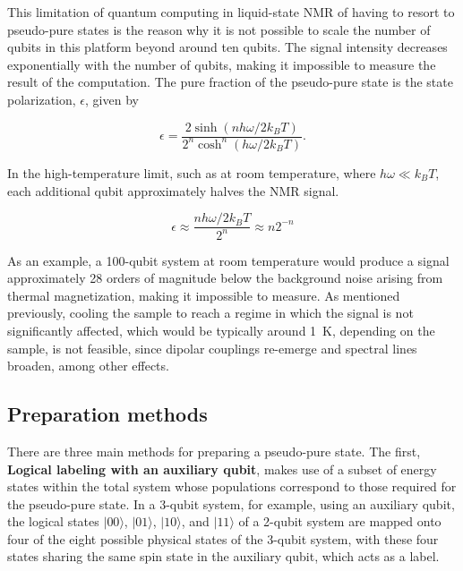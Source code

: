 This limitation of quantum computing in liquid-state NMR of having to resort to pseudo-pure states is the reason why it is not possible to scale the number of qubits in this platform beyond around ten qubits. The signal intensity decreases exponentially with the number of qubits, making it impossible to measure the result of the computation. The pure fraction of the pseudo-pure state is the state polarization, \(\epsilon\), given by

\begin{equation}
    \epsilon=\frac{2\sinh{(nh\omega/2k_B T)}}{2^n\cosh^n{(h\omega/2k_B T)}}.
    \label{eq:polarization}
\end{equation}

In the high-temperature limit, such as at room temperature, where \(h\omega \ll k_B T\), each additional qubit approximately halves the NMR signal.

\begin{equation}
    \epsilon\approx\frac{nh\omega/2k_B T}{2^n}\approx n 2^{-n}
    \label{eq:polarization_limit}
\end{equation}

As an example, a 100-qubit system at room temperature would produce a signal approximately 28 orders of magnitude below the background noise arising from thermal magnetization, making it impossible to measure. As mentioned previously, cooling the sample to reach a regime in which the signal is not significantly affected, which would be typically around \SI{1}{\kelvin}, depending on the sample, is not feasible, since dipolar couplings re-emerge and spectral lines broaden, among other effects.


\subsection{Preparation methods}
\label{subsec:pseudo_pure_state_preparation}

There are three main methods for preparing a pseudo-pure state. The first, \textbf{Logical labeling with an auxiliary qubit}, makes use of a subset of energy states within the total system whose populations correspond to those required for the pseudo-pure state. In a 3-qubit system, for example, using an auxiliary qubit, the logical states \(\lvert00\rangle\), \(\lvert01\rangle\), \(\lvert10\rangle\), and \(\lvert11\rangle\) of a 2-qubit system are mapped onto four of the eight possible physical states of the 3-qubit system, with these four states sharing the same spin state in the auxiliary qubit, which acts as a label.

